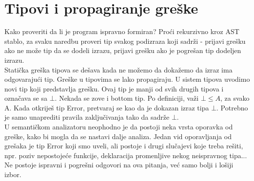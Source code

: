 \documentclass[10pt]{extarticle}
\begin{document}
\section{Tipovi i propagiranje greške}
\noindent
Kako proveriti da li je program ispravno formiran? Proći rekurzivno kroz AST stablo, za svaku naredbu proveri tip svakog podizraza koji sadrži - prijavi grešku ako ne može tip da se dodeli izrazu, prijavi grešku ako je pogrešan tip dodeljen izrazu. \\
Statička greška tipova se dešava kada ne možemo da dokažemo da izraz ima odgovarajući tip. Greške u tipovima se lako propagiraju. U sistem tipova uvodimo novi tip koji predstavlja grešku. Ovaj tip je manji od svih drugih tipova i označava se sa $\bot$. Nekada se zove i bottom tip. Po definiciji, važi $\bot \leq A$, za svako A. Kada otkriješ tip Error, pretvaraj se kao da je dokazan izraz tipa $\bot$. Potrebno je samo unaprediti pravila zaključivanja tako da sadrže $\bot$.\\
U semantičkom analizatoru neophodno je da postoji neka vrsta oporavka od greške, kako bi mogla da se nastavi dalje analiza. Jedan vid oporavljanja od grešaka je tip Error koji smo uveli, ali postoje i drugi slučajevi koje treba rešiti, npr. poziv nepostojeće funkcije, deklaracija promenljive nekog neispravnog tipa... Ne postoje ispravni i pogrešni odgovori na ova pitanja, već samo bolji i lošiji izbor.
\end{document}
